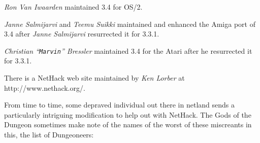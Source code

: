 %
{\it Ron Van Iwaarden}%
maintained 3.4 for OS/2.

%
{\it Janne Salmijarvi}%
and %
{\it Teemu Suikki}%
maintained and 
enhanced the Amiga port of 3.4 after %
{\it Janne Salmijarvi}%
resurrected 
it for 3.3.1.

%
{\it Christian ``{\tt Marvin}'' Bressler}%
maintained 3.4 for the Atari after he 
resurrected it for 3.3.1.

There is a NetHack web site maintained by %
{\it Ken Lorber}%
at http://www.nethack.org/.

From time to time, some depraved individual out there in netland sends a
particularly intriguing modification to help out with NetHack.  The Gods of
the Dungeon sometimes make note of the names of the worst of these miscreants
in this, the list of Dungeoneers:

